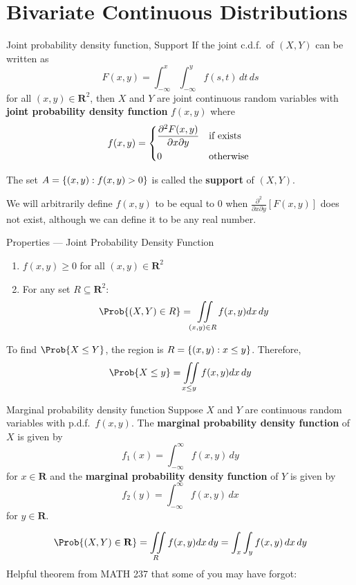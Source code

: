 \section{Bivariate Continuous Distributions}
\begin{Definition}{Joint probability density function, Support}{}
    If the joint c.d.f.\ of $ (X,Y) $ can be written as
    \[ F(x,y)=\int_{-\infty}^{x} \int_{-\infty}^{y} f(s,t)\, d{t} \, d{s} \]
    for all $ (x,y)\in\mathbf{R}^2 $, then $ X $ and $ Y $
    are joint continuous random variables with \textbf{joint probability
        density function} $ f(x,y) $ where
    \[ f(x,y)=\begin{dcases*}
            \frac{\partial^2 F(x,y)}{\partial x\partial y} & if exists \\
            0                                              & otherwise
        \end{dcases*} \]

    The set $ A=\{(x,y):f(x,y)>0\} $ is called the \textbf{support} of $ (X,Y) $.
\end{Definition}
\begin{Remark}{}{}
    We will arbitrarily define $ f(x,y) $ to be equal to $ 0 $ when
    $ \displaystyle  \frac{\partial^2}{\partial x\partial y}[F(x,y)]
    $
    does not exist, although we can define it to be any real number.
\end{Remark}
\begin{Definition}{Properties --- Joint Probability Density Function}{}
    \begin{enumerate}[label=(\Roman*)]
        \item $ f(x,y)\ge 0 $ for all $ (x,y)\in\mathbf{R}^2 $
        \item For any set $ R\subseteq \mathbf{R}^2 $:
              \begin{align*}
                  \Prob{(X,Y)\in R}
                   & =\iint\limits_{(x,y)\in R}f(x,y)dx\,dy
              \end{align*}
    \end{enumerate}
\end{Definition}
\begin{Example}{}{}
    To find $ \Prob{X\le Y} $, the region is
    $ R=\{(x,y):x\le y\} $. Therefore,
    \[ \Prob{X\le y}=
        \iint\limits_{x\le y}f(x,y)dx\,dy \]
\end{Example}
\begin{Definition}{Marginal probability density function}{}
    Suppose $ X $ and $ Y $ are continuous random variables with
    p.d.f.\ $ f(x,y) $. The \textbf{marginal probability
        density function} of $ X $ is given by
    \[ f_1(x)=\int_{-\infty}^{\infty} f(x,y)\, d{y} \]
    for $ x\in\mathbf{R} $ and the \textbf{marginal probability
        density function} of $ Y $ is given by
    \[ f_2(y)=\int_{-\infty}^{\infty} f(x,y)\, d{x}  \]
    for $ y\in\mathbf{R} $.
\end{Definition}
\[ \Prob{(X,Y)\in\mathbf{R}}
    =\iint\limits_{R}f(x,y)dx\,dy=
    \int_{x} \int_{y}f(x,y) \, d{x} \, d{y} \]
Helpful theorem from MATH 237 that some of you may have forgot:

